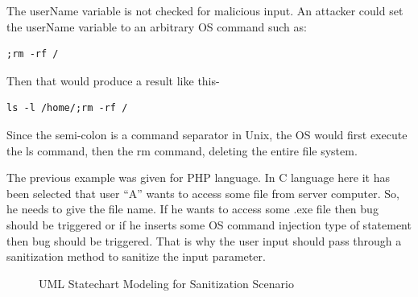 The userName variable is not checked for malicious input. An attacker could set the userName variable to an arbitrary OS command such as:
\begin{lstlisting}
;rm -rf /
\end{lstlisting}
Then that would produce a result like this-
\begin{lstlisting}
ls -l /home/;rm -rf /
\end{lstlisting}
Since the semi-colon is a command separator in Unix, the OS would first execute the ls command, then the rm command, deleting the entire file system.

The previous example was given for PHP language. In C language here it has been selected that user \enquote{A} wants to access some file from server computer. So, he needs to give the file name. If he wants to access some .exe file then bug should be triggered or if he inserts some OS command injection type of statement then bug should be triggered. That is why the user input should pass through a sanitization method to sanitize the input parameter.

\begin{figure}[htbp]
	\centering
	\label{sanitization_scenario}
	\caption{UML Statechart Modeling for Sanitization Scenario}
\end{figure}

